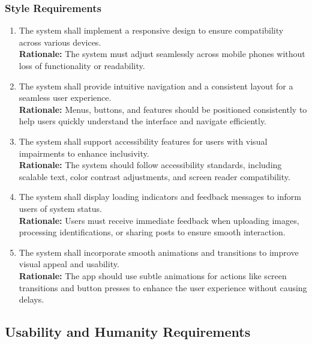 \documentclass[]{article}
\begin{document}
\begin{enumerate}[{\bf BE1.}]
\subsubsection{Style Requirements}
\label{ssub:style_requirements}
\begin{enumerate}[{LF-S}1. ]
	\item The system shall implement a responsive design to ensure compatibility across various devices.\\
	\textbf{Rationale:} The system must adjust seamlessly across mobile phones without loss of functionality or readability.
	\item The system shall provide intuitive navigation and a consistent layout for a seamless user experience.\\
	\textbf{Rationale:} Menus, buttons, and features should be positioned consistently to help users quickly understand the interface and navigate efficiently.
	\item The system shall support accessibility features for users with visual impairments to enhance inclusivity.\\
	\textbf{Rationale:} The system should follow accessibility standards, including scalable text, color contrast adjustments, and screen reader compatibility.
	\item The system shall display loading indicators and feedback messages to inform users of system status.\\
	\textbf{Rationale:} Users must receive immediate feedback when uploading images, processing identifications, or sharing posts to ensure smooth interaction.
	\item The system shall incorporate smooth animations and transitions to improve visual appeal and usability.\\
	\textbf{Rationale:} The app should use subtle animations for actions like screen transitions and button presses to enhance the user experience without causing delays.
\end{enumerate}


\subsection{Usability and Humanity Requirements}
\label{sub:usability_and_humanity_requirements}


\end{enumerate}
\end{document}
